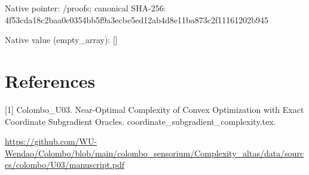 \documentclass[10pt,a4paper]{article}
\begin{document}
Native pointer: /proofs; canonical SHA-256: 4f53cda18c2baa0c0354bb5f\allowbreak{}9a3ecbe5ed12ab4d8e11ba87\allowbreak{}3c2f11161202b945



Native value (empty\_array): []



\section{References}


[1] Colombo\_U03. Near-Optimal Complexity of Convex Optimization with Exact Coordinate Subgradient Oracles. coordinate\_subgradient\_complexity.tex.



\url{https://github.com/WU-Wendao/Colombo/blob/main/colombo_sensorium/Complexity_altas/data/sources/colombo/U03/manuscript.pdf}
\end{document}
